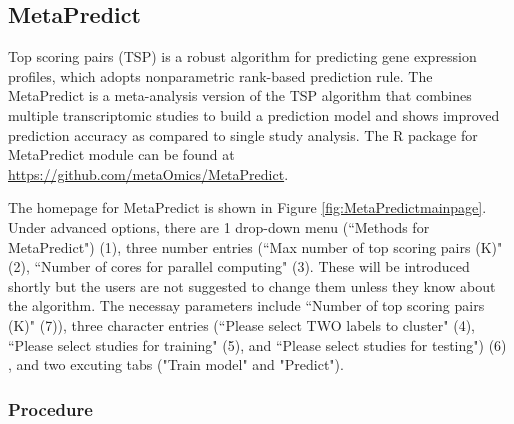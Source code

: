 \subsection{MetaPredict}

Top scoring pairs (TSP) is a robust algorithm for predicting gene expression profiles,
which adopts nonparametric rank-based prediction rule.
The MetaPredict is a meta-analysis version of the TSP algorithm that combines multiple transcriptomic studies to build a prediction model and shows improved 
prediction accuracy as compared to single study analysis.
The R package for MetaPredict module can be found at \url{https://github.com/metaOmics/MetaPredict}.

The homepage for MetaPredict is shown in Figure \ref{fig:MetaPredictmainpage}.
Under advanced options,  there are 1 drop-down menu (``Methods for MetaPredict") {\color{red} (1)}, three number entries (``Max number of top scoring pairs (K)" {\color{red} (2)}, ``Number of cores for parallel computing" {\color{red} (3)}.
These will be introduced shortly but the users are not suggested to change them unless they know about the algorithm.
The necessay parameters include ``Number of top scoring pairs (K)" {\color{red} (7)}), three character entries (``Please select TWO labels to cluster" {\color{red} (4)}, ``Please select studies for training" {\color{red} (5)}, and ``Please select studies for testing") {\color{red} (6)} , and two excuting tabs ("Train model" and "Predict"). 

\subsubsection{Procedure}

